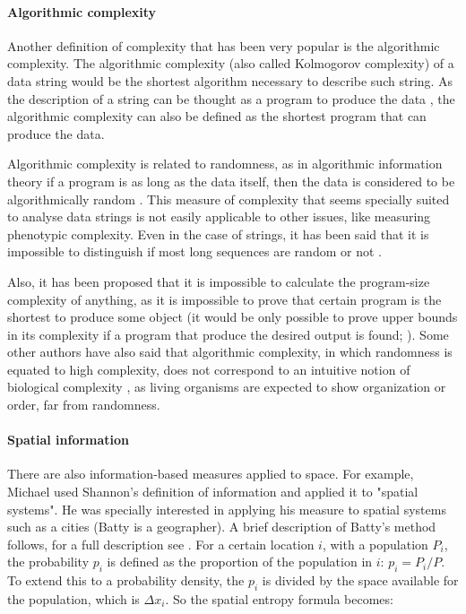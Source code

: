 \paragraph{Algorithmic complexity}
Another definition of complexity that has been very popular is the algorithmic complexity. The algorithmic complexity (also called Kolmogorov complexity) of a data string would be the shortest algorithm necessary to describe such string. As the description of a string can be thought as a program to produce the data \citep{Kolmogorov1963,Wolfram2002}, the algorithmic complexity can also be defined as the shortest program that can produce the data.

Algorithmic complexity is related to randomness, as in algorithmic information theory if a program is as long as the data itself, then the data is considered to be algorithmically random \citep{Wolfram2002}. This measure of complexity that seems specially suited to analyse data strings  is not easily applicable to other issues, like measuring phenotypic complexity. Even in the case of strings, it has been said that it is impossible to distinguish if most long sequences are random or not \citep{Wolfram2002}. 

Also, it has been proposed that it is impossible to calculate the program-size complexity of anything, as it is impossible to prove that certain program is the shortest to produce some object (it would be only possible to prove upper bounds in its complexity if a program that produce the desired output is found; \citealp{chaitin1999unknowable}).
Some other authors have also said that algorithmic complexity, in which randomness is equated to high complexity, does not correspond to an intuitive notion of biological complexity \citep{Adami2002}, as living organisms are expected to show organization or order, far from randomness. 

\paragraph{Spatial information}
There are also information-based measures applied to space. For example, Michael \citet{Batty1974} used Shannon's definition of information and applied it to "spatial systems". He was specially interested in applying his measure to spatial systems such as a cities (Batty is a geographer). A brief description of Batty's method follows, for a full description see \citep{Batty1974,Batty2014}. For a certain location $i$, with a population $P_{i}$, the probability $p_{i}$ is defined as the proportion of the population in $i$: $p_{i} = P_{i}/P$.  To extend this to a probability density, the $p_{i}$ is divided by the space available for the population, which is $\Delta x_{i}$. So the spatial entropy formula becomes:

